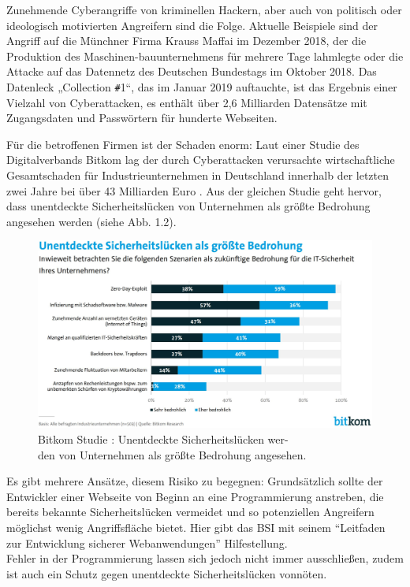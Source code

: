 \documentclass[12pt,oneside,a4paper,parskip,pointlessnumbers]{scrbook}
\begin{document}
Zunehmende Cyberangriffe von kriminellen Hackern, aber auch von politisch oder ideologisch motivierten Angreifern sind die Folge. Aktuelle Beispiele sind der Angriff auf die Münchner Firma Krauss Maffai im Dezember 2018, der die Produktion des Maschinen-bauunternehmens für mehrere Tage lahmlegte oder die Attacke auf das Datennetz des Deutschen Bundestags im Oktober 2018. Das Datenleck „Collection \texttt{\#}1“, das im Januar 2019 auftauchte, ist das Ergebnis einer Vielzahl von Cyberattacken, es enthält über 2,6 Milliarden Datensätze mit Zugangsdaten und Passwörtern für hunderte Webseiten.

Für die betroffenen Firmen ist der Schaden enorm: Laut einer Studie des Digitalverbands Bitkom lag der durch Cyberattacken verursachte wirtschaftliche Gesamtschaden für Industrieunternehmen in Deutschland innerhalb der letzten zwei Jahre bei über 43 Milliarden Euro \cite{Bitkom}. Aus der gleichen Studie geht hervor, dass unentdeckte Sicherheitslücken von Unternehmen als größte Bedrohung angesehen werden (siehe Abb. 1.2).\\

\begin{figure}[H]
  \centering
   \includegraphics[width=1\textwidth]{Images/Bitkom}
  \caption[Bitkom Studie - Bedrohungsszenarien]{Bitkom Studie \cite{Bitkom}: Unentdeckte Sicherheitslücken wer- \\den von Unternehmen als größte Bedrohung angesehen.}
\end{figure}
Es gibt mehrere Ansätze, diesem Risiko zu begegnen: Grundsätzlich sollte der Entwickler einer Webseite von Beginn an eine Programmierung anstreben, die bereits bekannte Sicherheitslücken vermeidet und so potenziellen Angreifern möglichst wenig Angriffsfläche bietet. Hier gibt das \ac{BSI} mit seinem ``Leitfaden zur Entwicklung sicherer Webanwendungen''  \cite{BSI} Hilfestellung.\\
Fehler in der Programmierung lassen sich jedoch nicht immer ausschließen, zudem ist auch ein Schutz gegen unentdeckte Sicherheitslücken vonnöten.
\end{document}
